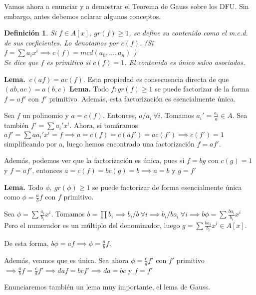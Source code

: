 \documentclass[11pt, a4paper, titlepage]{article}
\makeatletter
\renewenvironment{proof}[1][\proofname] {\vspace{-15pt}\par\pushQED{\qed}\normalfont\topsep6\p@\@plus6\p@\relax\trivlist\item[\hskip\labelsep\it#1\@addpunct{.}]\ignorespaces}{\popQED\endtrivlist\@endpefalse}
\theoremstyle{theorem-style}
\theoremstyle{definition-style}
\newtheorem*{ndef}{Definición}
\theoremstyle{remark-style}
\theoremstyle{example-style}
\makeatother
\begin{document}
Vamos ahora a enunciar y a demostrar el Teorema de Gauss sobre los DFU. Sin embargo, antes debemos aclarar algunos conceptos.
\begin{ndef}
Si $f \in A[x],\ gr(f) \geq 1$, se define su contenido como el m.c.d. de sus coeficientes. Lo denotamos por $c(f)$. (Si $f= \sum a_i x^i \implies c(f) = mcd(a_0,...,a_n)$	)\\
Se dice que $f$ es primitivo si $c(f) = 1$. El contenido es único salvo asociados.
\end{ndef}
\textbf{Lema.} $ \ c(af) = ac(f)$. Esta propiedad es consecuencia directa de que $(ab,ac) = a(b,c)$
\textbf{Lema.} Todo $f: gr(f) \geq 1$ se puede factorizar de la forma $f = af'$ con $f'$ primitivo. Además, esta factorización es esencialmente única.
\begin{proof}
	Sea $f$ un polinomio y $a = c(f)$. Entonces, $a/a_i \ \forall i$. Tomamos $a_i' = \frac{a_i}{a} \in A$. Sea también $f' = \sum a_i'x^i$. Ahora, si tomáramos $af'= \sum aa_i' x^i = f \implies a = c(f) = c(af') = ac(f') \implies c(f') = 1$ simplificando por a, luego hemos encontrado una factorización $f=af'$.
	
	Además, podemos ver que la factorización es única, pues si $f=bg$ con $c(g)=1$ y $f=af'$, entonces $a = c(f) = b c(g) = b \implies a=b$ y $g=f'$
\end{proof}

\textbf{Lema.} Todo $\phi,\ gr(\phi) \geq 1$ se puede factorizar de forma esencialmente única como $\phi = \frac{a}{b} f$ con $f$ primitivo.
\begin{proof}
	Sea $\phi = \sum \frac{a_i}{b_i} x^i$. Tomamos $b= \prod b_i \implies b_i/b \ \forall i \implies b_i /ba_i \ \forall i \implies b \phi = \sum \frac{ba_i}{b_i}x^i$ Pero el numerador es un múltiplo del denominador, luego $g = \sum \frac{ba_i}{b_i}x^i \in A[x]$.
	
	De esta forma, $b\phi = af \implies \phi = \frac{a}{b} f$.
	
	Además, veamos que es única. Sea ahora $\phi = \frac{c}{d} f'$ con $f'$ primitivo$\implies \frac{a}{b} f = \frac{c}{d} f' \implies daf=bcf' \implies da = bc$ y $f=f'$
\end{proof}

Enunciaremos también un lema muy importante, el lema de Gauss.\\
\end{document}

